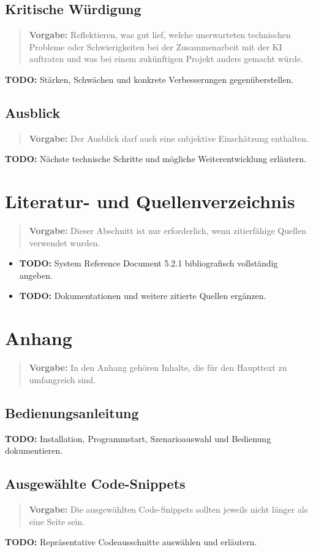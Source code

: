 \documentclass[
  12pt,
  a4paper,
  oneside,
  parskip=half,
  headings=normal
]{scrreprt}
\newcommand{\vorgabe}[1]{%
  \begin{quote}
    \small\color{hinweisfarbe}\textbf{Vorgabe:} #1
  \end{quote}
}
\newcommand{\todo}[1]{%
  \par\noindent\textcolor{red!70!black}{\textbf{TODO:} #1}\par
}
\begin{document}
\section{Kritische Würdigung}

\vorgabe{Reflektieren, was gut lief, welche unerwarteten technischen Probleme
oder Schwierigkeiten bei der Zusammenarbeit mit der KI auftraten und was bei
einem zukünftigen Projekt anders gemacht würde.}

\todo{Stärken, Schwächen und konkrete Verbesserungen gegenüberstellen.}

\section{Ausblick}
\vorgabe{Der Ausblick darf auch eine subjektive Einschätzung enthalten.}
\todo{Nächste technische Schritte und mögliche Weiterentwicklung erläutern.}

\chapter{Literatur- und Quellenverzeichnis}

\vorgabe{Dieser Abschnitt ist nur erforderlich, wenn zitierfähige Quellen
verwendet wurden.}

\begin{itemize}
  \item \todo{System Reference Document 5.2.1 bibliografisch vollständig
        angeben.}
  \item \todo{Dokumentationen und weitere zitierte Quellen ergänzen.}
\end{itemize}

\chapter{Anhang}

\vorgabe{In den Anhang gehören Inhalte, die für den Haupttext zu umfangreich
sind.}

\section{Bedienungsanleitung}
\todo{Installation, Programmstart, Szenarioauswahl und Bedienung dokumentieren.}

\section{Ausgewählte Code-Snippets}
\vorgabe{Die ausgewählten Code-Snippets sollten jeweils nicht länger als eine
Seite sein.}

% 

\todo{Repräsentative Codeausschnitte auswählen und erläutern.}
\end{document}
